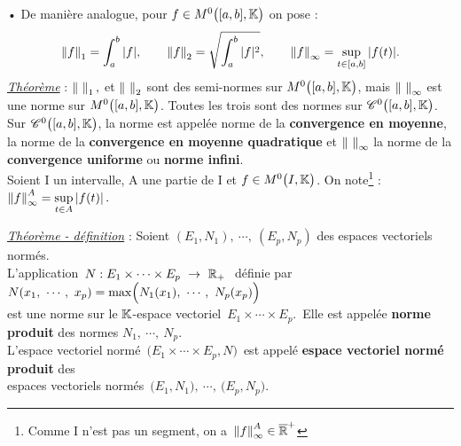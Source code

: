 • De manière analogue, pour \(f\in M^0\bigl([a,b],\mathbb{K}\bigr) \) on pose :\vspace{-0.3cm}
\[ \left\lVert f\right\rVert_1=\int_a^b |f|, \qquad \left\lVert f\right\rVert_2=\sqrt{\int_a^b |f|^2}, \qquad \left\lVert f\right\rVert_\infty = \sup_{t\in [a,b]} |f(t)|.\]
\underline{\emph{Théorème}} : \(\left\lVert\ \right\rVert_1,\) et \( \left\lVert\ \right\rVert_2  \) sont des semi-normes sur \(M^0\bigl([a,b],\mathbb{K}\bigr)\), mais \(\left\lVert\ \right\rVert_\infty\) est une norme sur \(M^0\bigl([a,b],\mathbb{K}\bigr)\). Toutes les trois sont des normes sur \(\mathscr{C}^0\bigl([a,b],\mathbb{K}\bigr)\).\\
Sur \(\mathscr{C}^0\bigl([a,b],\mathbb{K}\bigr)\), la norme \normtxt{\ } est appelée norme de la \textbf{convergence en moyenne}, \normtxt{\ } la norme de la \textbf{convergence en moyenne quadratique} et \(\left\lVert\ \right\rVert_\infty \) la norme de la \textbf{convergence uniforme} ou \textbf{norme infini}.\\
Soient I un intervalle, A une partie de I et \(f\in M^0\bigl(I,\mathbb{K}\bigr)\). On note\footnote{Comme I n'est pas un segment, on a \(\,\left\lVert f\right\rVert_\infty^A\in \overline{\mathbb{R}}^+\)} : \(\displaystyle \left\lVert f\right\rVert_\infty^A=\sup_{t\in A}|f(t)|\,.\) 

\vspace{1.2cm}

\underline{\emph{Théorème - définition}} : Soient \((E_1,N_1),\ \cdots,\ (E_p,N_p)\) des espaces vectoriels normés.\\
L'application \(\,N : E_1\times \cdots \times E_p \ \to \ \mathbb{R}_+ \ \) définie par \( N(x_1,\ \cdots,\ x_p)= \max \Bigl( N_1(x_1),\ \cdots,\ N_p(x_p) \Bigr)  \) \\
est une norme sur le \(\mathbb{K}\)-espace vectoriel \(\,E_1\times \cdots \times E_p\).\, Elle est appelée \textbf{norme produit} des normes \(N_1,\ \cdots,\ N_p\).\\
L'espace vectoriel normé \(\,\bigl(E_1\times \cdots \times E_p, N\bigr)\, \) est appelé \textbf{espace vectoriel normé produit} des\vspace{0.1cm}\\
espaces vectoriels normés \(\,\bigl(E_1,N_1\bigr),\ \cdots,\ \bigl(E_p,N_p\bigr)\).

\vspace{1.5cm}

